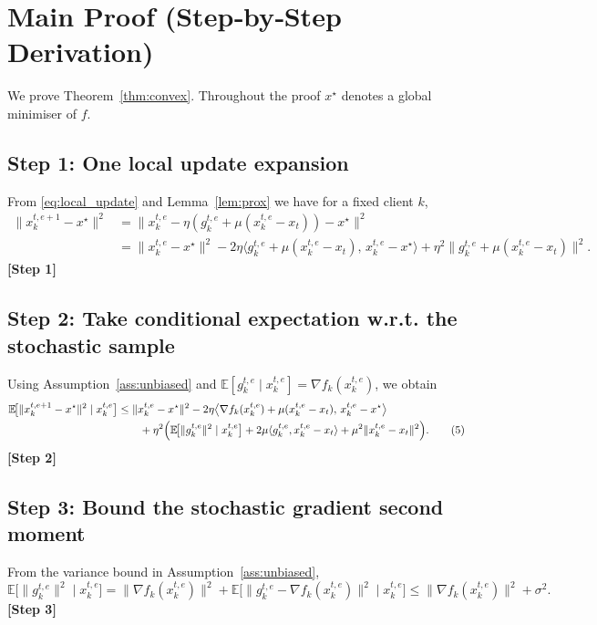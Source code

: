 \documentclass{article}
\newcommand{\E}{\mathbb{E}}
\begin{document}
\section*{Main Proof (Step‑by‑Step Derivation)}
We prove Theorem~\ref{thm:convex}.  Throughout the proof $x^\star$ denotes a global minimiser of $f$.

\subsection*{Step 1: One local update expansion}
From \eqref{eq:local_update} and Lemma~\ref{lem:prox} we have for a fixed client $k$,
\begin{align}
\|x_{k}^{t,e+1}-x^\star\|^2 
&= \bigl\|x_{k}^{t,e}-\eta(g_{k}^{t,e}+\mu(x_{k}^{t,e}-x_t)) -x^\star\bigr\|^2 \nonumber\\[1ex]
&= \|x_{k}^{t,e}-x^\star\|^2 
   -2\eta\bigl\langle g_{k}^{t,e}+\mu(x_{k}^{t,e}-x_t),\,x_{k}^{t,e}-x^\star\bigr\rangle 
   +\eta^2\|g_{k}^{t,e}+\mu(x_{k}^{t,e}-x_t)\|^2 . \tag{4}
\end{align}
\textbf{[Step 1]}

\subsection*{Step 2: Take conditional expectation w.r.t. the stochastic sample}
Using Assumption~\ref{ass:unbiased} and $\E[g_{k}^{t,e}\mid x_{k}^{t,e}]=\nabla f_k(x_{k}^{t,e})$, we obtain
\begin{align}
\E\!\bigl[\|x_{k}^{t,e+1}-x^\star\|^2\mid x_{k}^{t,e}\bigr] 
&\le \|x_{k}^{t,e}-x^\star\|^2 
   -2\eta\bigl\langle \nabla f_k(x_{k}^{t,e})+\mu(x_{k}^{t,e}-x_t),\,x_{k}^{t,e}-x^\star\bigr\rangle \nonumber\\
&\qquad +\eta^2\Bigl(\E\!\bigl[\|g_{k}^{t,e}\|^2\mid x_{k}^{t,e}\bigr] 
   +2\mu\langle g_{k}^{t,e},x_{k}^{t,e}-x_t\rangle 
   +\mu^2\|x_{k}^{t,e}-x_t\|^2\Bigr). \tag{5}
\end{align}
\textbf{[Step 2]}

\subsection*{Step 3: Bound the stochastic gradient second moment}
From the variance bound in Assumption~\ref{ass:unbiased},
\[
\E\!\bigl[\|g_{k}^{t,e}\|^2\mid x_{k}^{t,e}\bigr]
   =\|\nabla f_k(x_{k}^{t,e})\|^2+\E\!\bigl[\|g_{k}^{t,e}-\nabla f_k(x_{k}^{t,e})\|^2\mid x_{k}^{t,e}\bigr]
   \le\|\nabla f_k(x_{k}^{t,e})\|^2+\sigma^2 . \tag{6}
\]
\textbf{[Step 3]}
\end{document}
